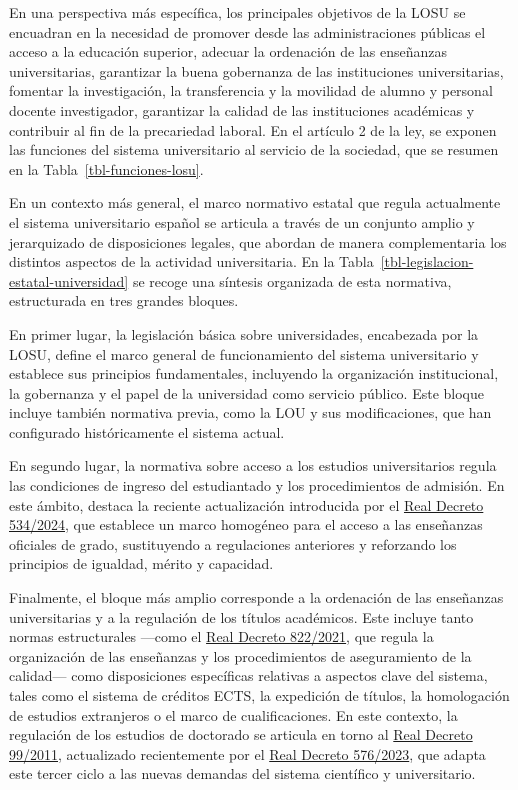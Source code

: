 \documentclass[
  11pt,
  a4paper,
  twoside]{scrreprt}
\begin{document}
En una perspectiva más específica, los principales objetivos de la LOSU
se encuadran en la necesidad de promover desde las administraciones
públicas el acceso a la educación superior, adecuar la ordenación de las
enseñanzas universitarias, garantizar la buena gobernanza de las
instituciones universitarias, fomentar la investigación, la
transferencia y la movilidad de alumno y personal docente investigador,
garantizar la calidad de las instituciones académicas y contribuir al
fin de la precariedad laboral. En el artículo 2 de la ley, se exponen
las funciones del sistema universitario al servicio de la sociedad, que
se resumen en la Tabla~\ref{tbl-funciones-losu}.

En un contexto más general, el marco normativo estatal que regula
actualmente el sistema universitario español se articula a través de un
conjunto amplio y jerarquizado de disposiciones legales, que abordan de
manera complementaria los distintos aspectos de la actividad
universitaria. En la Tabla~\ref{tbl-legislacion-estatal-universidad} se
recoge una síntesis organizada de esta normativa, estructurada en tres
grandes bloques.

En primer lugar, la legislación básica sobre universidades, encabezada
por la LOSU, define el marco general de funcionamiento del sistema
universitario y establece sus principios fundamentales, incluyendo la
organización institucional, la gobernanza y el papel de la universidad
como servicio público. Este bloque incluye también normativa previa,
como la LOU y sus modificaciones, que han configurado históricamente el
sistema actual.

En segundo lugar, la normativa sobre acceso a los estudios
universitarios regula las condiciones de ingreso del estudiantado y los
procedimientos de admisión. En este ámbito, destaca la reciente
actualización introducida por el
\href{https://www.boe.es/buscar/act.php?id=BOE-A-2024-11858}{Real
Decreto 534/2024}, que establece un marco homogéneo para el acceso a las
enseñanzas oficiales de grado, sustituyendo a regulaciones anteriores y
reforzando los principios de igualdad, mérito y capacidad.

Finalmente, el bloque más amplio corresponde a la ordenación de las
enseñanzas universitarias y a la regulación de los títulos académicos.
Este incluye tanto normas estructurales ---como el
\href{https://www.boe.es/buscar/act.php?id=BOE-A-2021-15781}{Real
Decreto 822/2021}, que regula la organización de las enseñanzas y los
procedimientos de aseguramiento de la calidad--- como disposiciones
específicas relativas a aspectos clave del sistema, tales como el
sistema de créditos ECTS, la expedición de títulos, la homologación de
estudios extranjeros o el marco de cualificaciones. En este contexto, la
regulación de los estudios de doctorado se articula en torno al
\href{https://www.boe.es/buscar/act.php?id=BOE-A-2011-2541}{Real Decreto
99/2011}, actualizado recientemente por el
\href{https://www.boe.es/buscar/doc.php?id=BOE-A-2023-16573}{Real
Decreto 576/2023}, que adapta este tercer ciclo a las nuevas demandas
del sistema científico y universitario.
\end{document}
